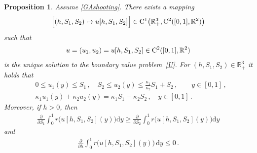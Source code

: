 \documentclass[reqno,11pt]{amsart}
\newtheorem{prop}[thm]{Proposition}
\numberwithin{equation}{section}
\newcommand{\R}{\mathbb{R}}
\newcommand{\rd}{\mathrm{d}}
\begin{document}
\begin{prop}\label{P1}
Assume \eqref{GAshooting}. There exists  a mapping
$$
\Bigl[ (h,S_1,S_2)\mapsto u[h,S_1,S_2]\Bigr]\in {\rm C}^1\big(\R_+^3,
{\rm C}^2([0,1],\R^2)\big)
$$
such that $$u=(u_1,u_2)=u[h,S_1,S_2]\in {\rm C}^2([0,1],\R^2)$$ is the unique solution to the boundary value problem~\eqref{U}.
For $(h,S_1,S_2)\in\R_+^3$ it holds that
\begin{subequations}\label{ccc}
\begin{align}
&0\le u_1(y)\le S_1\,,\quad S_2\le u_2(y)\le \frac{\kappa_1}{\kappa_2}S_1+S_2\,,\qquad y\in [0,1]\,,\label{ccc1}\\
& \kappa_1 u_1(y)+ \kappa_2 u_2(y)= \kappa_1 S_1+\kappa_2 S_2\,,\quad  y\in [0,1]\,. \label{ccc3}
\end{align}
\end{subequations}
Moreover, if $h>0$, then
\begin{align}\label{G}
\frac{\partial}{\partial {S_1}}\int_0^1 r\big(u[h,S_1,S_2](y)\big) \rd y \ge  \frac{\partial}{\partial {S_2}}\int_0^1 r\big(u[h,S_1,S_2](y)\big) \rd y
\end{align}
and
\begin{align}\label{GR}
\frac{\partial}{\partial h}\int_0^1 r\big(u[h,S_1,S_2](y)\big)\,\rd y\le 0\,.
\end{align}
\end{prop}
\end{document}
